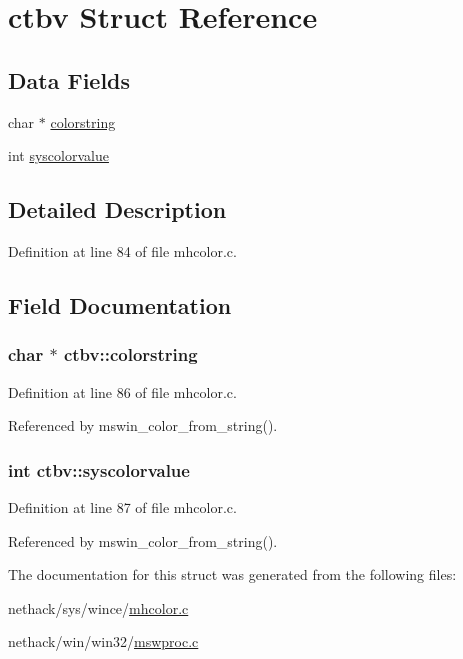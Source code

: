 \hypertarget{structctbv}{\section{ctbv Struct Reference}
\label{structctbv}
}
\subsection*{Data Fields}
\begin{DoxyCompactItemize}
\item 
char $\ast$ \hyperlink{structctbv_a6576045a02ca8194f79f3201927a0806}{colorstring}
\item 
int \hyperlink{structctbv_a17822b698094e253368ff07fdf2fcf63}{syscolorvalue}
\end{DoxyCompactItemize}


\subsection{Detailed Description}


Definition at line 84 of file mhcolor.\+c.



\subsection{Field Documentation}
\hypertarget{structctbv_a6576045a02ca8194f79f3201927a0806}{
\subsubsection[{colorstring}]{\setlength{\rightskip}{0pt plus 5cm}char $\ast$ ctbv\+::colorstring}}\label{structctbv_a6576045a02ca8194f79f3201927a0806}


Definition at line 86 of file mhcolor.\+c.



Referenced by mswin\+\_\+color\+\_\+from\+\_\+string().

\hypertarget{structctbv_a17822b698094e253368ff07fdf2fcf63}{
\subsubsection[{syscolorvalue}]{\setlength{\rightskip}{0pt plus 5cm}int ctbv\+::syscolorvalue}}\label{structctbv_a17822b698094e253368ff07fdf2fcf63}


Definition at line 87 of file mhcolor.\+c.



Referenced by mswin\+\_\+color\+\_\+from\+\_\+string().



The documentation for this struct was generated from the following files\+:\begin{DoxyCompactItemize}
\item 
nethack/sys/wince/\hyperlink{mhcolor_8c}{mhcolor.\+c}\item 
nethack/win/win32/\hyperlink{win_2win32_2mswproc_8c}{mswproc.\+c}\end{DoxyCompactItemize}
